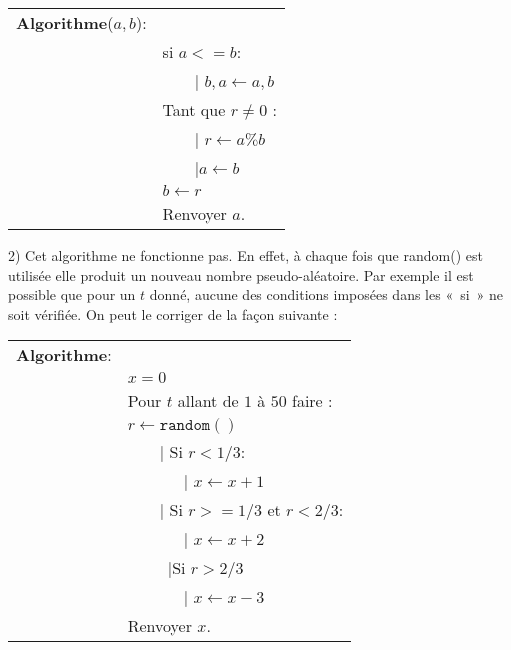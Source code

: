 \documentclass[11pt,a4paper]{article}
\begin{document}
 \begin{tabular}{ll}
\textbf{Algorithme}($a,b$):\\
& si $a<=b$:\\
&\ \ \ {\ \rm |} $b,a\leftarrow a,b$\\

& Tant que $r\neq 0$ :  \\
&\ \ \ {\ \rm |} $r \leftarrow a\%b$ \\
&\ \ \  {\ \rm |}$a\leftarrow b$\\
& $b\leftarrow r$ \\
& Renvoyer $a$. 
\end{tabular}


2) Cet algorithme ne fonctionne pas. En effet, à chaque fois que random() est utilisée elle produit un nouveau nombre pseudo-aléatoire. Par exemple il est possible que pour un $t$ donné, aucune des conditions imposées dans les «~si~» ne soit vérifiée. On peut le corriger de la façon suivante : 


 \begin{tabular}{ll}
\textbf{Algorithme}:\\
& $x=0$ \\
& Pour $t$ allant de $1$ à $50$ faire :\\
& $r\leftarrow \texttt{random}()$\\
&\ \ \ {\ \rm |} Si $r<1/3$: \\
&\ \ \ \ \ \ {\ \rm |} $x\leftarrow x+1$\\
&\ \ \ {\ \rm |} Si $r>=1/3$ et $r<2/3$: \\
&\ \ \ \ \ \ {\ \rm |} $x\leftarrow x+2$\\
&\ \ \ \ {\ \rm |}Si $r>2/3$ \\
&\ \ \ \ \ \ {\ \rm |} $x\leftarrow x-3$\\
& Renvoyer $x$. 
\end{tabular}
\end{document}
